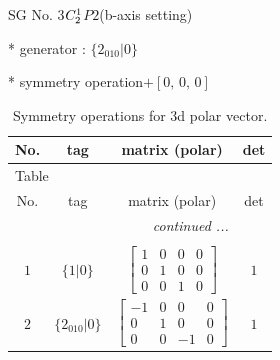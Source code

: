 \documentclass[fleqn,8pt]{jsarticle}
\begin{document}
\setcounter{MaxMatrixCols}{32}

\renewcommand{\tablename}{Table~}
\renewcommand{\figurename}{Figure~}
\begin{center}
\LARGE
SG No. 3\quad$C_{\rm 2}^{1}$\quad$P2$\quad(b-axis setting)\quad[ monoclinic ]
\end{center}

* generator : $\{2{}_{010}|0\}$

* symmetry operation\quad$+\left[ 0,\, 0,\, 0 \right]$
\renewcommand{\arraystretch}{1.3}
\begin{longtable}{cccc}
\caption{Symmetry operations for 3d polar vector.}
 \\
 \hline \hline
No. & tag & matrix (polar) & det \\ \hline \endfirsthead

\multicolumn{3}{l}{\tablename\ \thetable{}} \\
 \hline \hline
No. & tag & matrix (polar) & det \\ \hline \endhead

 \hline \hline
\multicolumn{3}{r}{\footnotesize\it continued ...} \\ \endfoot

 \hline \hline
\multicolumn{3}{r}{} \\ \endlastfoot

$ 1 $ & $ \{1|0\} $ & $ \begin{bmatrix} 1 & 0 & 0 & 0 \\ 0 & 1 & 0 & 0 \\ 0 & 0 & 1 & 0 \end{bmatrix} $ & $ 1 $ \\ \hline
$ 2 $ & $ \{2{}_{010}|0\} $ & $ \begin{bmatrix} -1 & 0 & 0 & 0 \\ 0 & 1 & 0 & 0 \\ 0 & 0 & -1 & 0 \end{bmatrix} $ & $ 1 $ \\
\end{longtable}
\end{document}
